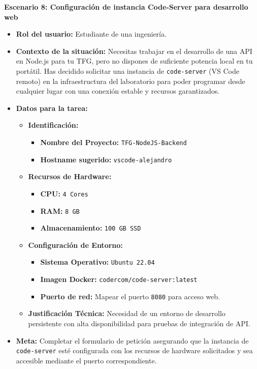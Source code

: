 \noindent\textbf{Escenario 8: Configuración de instancia Code-Server para desarrollo web}
\begin{itemize}
    \item \textbf{Rol del usuario:} Estudiante de una ingeniería.
    \item \textbf{Contexto de la situación:} 
    Necesitas trabajar en el desarrollo de una API en Node.js para tu TFG, pero no dispones de suficiente potencia local en tu portátil. Has decidido solicitar una instancia de \texttt{code-server} (VS Code remoto) en la infraestructura del laboratorio para poder programar desde cualquier lugar con una conexión estable y recursos garantizados.
    
    \item \textbf{Datos para la tarea:}
        \begin{itemize}
            \item \textbf{Identificación:} 
                \begin{itemize}
                    \item \textbf{Nombre del Proyecto:} \texttt{TFG-NodeJS-Backend}
                    \item \textbf{Hostname sugerido:} \texttt{vscode-alejandro}
                \end{itemize}
            \item \textbf{Recursos de Hardware:} 
                \begin{itemize}
                    \item \textbf{CPU:} \texttt{4 Cores}
                    \item \textbf{RAM:} \texttt{8 GB}
                    \item \textbf{Almacenamiento:} \texttt{100 GB SSD}
                \end{itemize}
            \item \textbf{Configuración de Entorno:}
                \begin{itemize}
                    \item \textbf{Sistema Operativo:} \texttt{Ubuntu 22.04}
                    \item \textbf{Imagen Docker:} \texttt{codercom/code-server:latest}
                    \item \textbf{Puerto de red:} Mapear el puerto \texttt{8080} para acceso web.
                \end{itemize}
            \item \textbf{Justificación Técnica:} Necesidad de un entorno de desarrollo persistente con alta disponibilidad para pruebas de integración de API.
        \end{itemize}
    \item \textbf{Meta:} 
    Completar el formulario de petición asegurando que la instancia de \texttt{code-server} esté configurada con los recursos de hardware solicitados y sea accesible mediante el puerto correspondiente.
\end{itemize}

